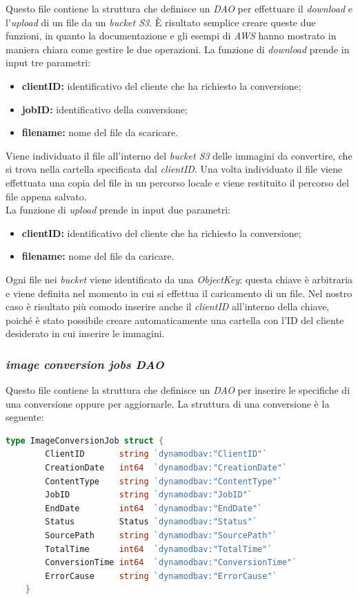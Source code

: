 Questo file contiene la struttura che definisce un \emph{DAO} per effettuare il
\emph{download} e l'\emph{upload} di un file da un \emph{bucket S3}. È risultato
semplice creare queste due funzioni, in quanto la documentazione e gli esempi di
\emph{AWS} hanno mostrato in maniera chiara come gestire le due operazioni. La funzione
di \emph{download} prende in input tre parametri:
\begin{itemize}
      \item \textbf{clientID:} identificativo del cliente che ha richiesto la
            conversione;
      \item \textbf{jobID:} identificativo della conversione;
      \item \textbf{filename:} nome del file da scaricare.
\end{itemize}

Viene individuato il file all'interno del \emph{bucket S3} delle immagini da convertire, che si trova nella
cartella specificata dal \emph{clientID}. Una volta individuato il file viene effettuata una
copia del file in un percorso locale e viene restituito il percorso del file
appena salvato.\\

La funzione di \emph{upload} prende in input due parametri:
\begin{itemize}
      \item \textbf{clientID:} identificativo del cliente che ha richiesto la
            conversione;
      \item \textbf{filename:} nome del file da caricare.
\end{itemize}
Ogni file nei \emph{bucket} viene
identificato da una \emph{ObjectKey}: questa chiave è arbitraria e viene
definita nel momento in cui si effettua il caricamento di un file. Nel nostro
caso è risultato più comodo inserire anche il \emph{clientID} all'interno della chiave,
poiché è stato possibile creare automaticamente una cartella con l'ID del cliente desiderato
in cui inserire le immagini. \\

\subsubsection{\emph{image conversion jobs DAO}}

Questo file contiene la struttura che definisce un \emph{DAO} per inserire le
specifiche di una conversione oppure per aggiornarle. La struttura di una
conversione è la seguente:
\begin{lstlisting}[language=go]
    type ImageConversionJob struct {
        ClientID       string `dynamodbav:"ClientID"`
        CreationDate   int64  `dynamodbav:"CreationDate"`
        ContentType    string `dynamodbav:"ContentType"`
        JobID          string `dynamodbav:"JobID"`
        EndDate        int64  `dynamodbav:"EndDate"`
        Status         Status `dynamodbav:"Status"`
        SourcePath     string `dynamodbav:"SourcePath"`
        TotalTime      int64  `dynamodbav:"TotalTime"`
        ConversionTime int64  `dynamodbav:"ConversionTime"`
        ErrorCause     string `dynamodbav:"ErrorCause"`
    }
\end{lstlisting}

